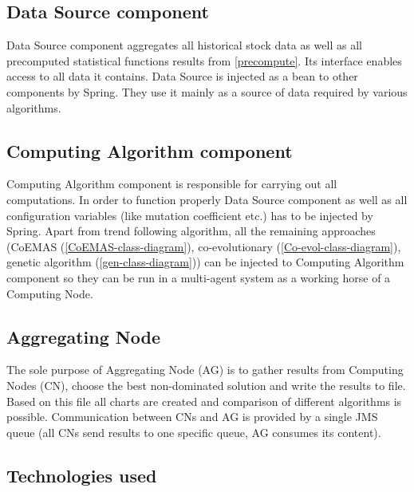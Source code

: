 \subsection{Data Source component}
\label{dataSource}

Data Source component aggregates all historical stock data as well as all precomputed statistical functions results from \ref{precompute}.   
Its interface enables access to all data it contains. Data Source is injected as a bean to other components by Spring.
They use it mainly as a source of data required by various algorithms.

\subsection{Computing Algorithm component}

Computing Algorithm component is responsible for carrying out all computations.
In order to function properly Data Source component as well as all configuration variables (like mutation coefficient etc.) has to be injected by Spring.
Apart from trend following algorithm, all the remaining approaches (CoEMAS (\ref{CoEMAS-class-diagram}), co-evolutionary (\ref{Co-evol-class-diagram}),
 genetic algorithm (\ref{gen-class-diagram})) can be injected to Computing Algorithm component so they can be run
 in a multi-agent system as a working horse of a Computing Node.


\subsection{Aggregating Node}

The sole purpose of Aggregating Node (AG) is to gather results from Computing Nodes (CN), choose the best non-dominated solution and write the results to file. 
Based on this file all charts are created and comparison of different algorithms is possible.
Communication between CNs and AG is provided by a single JMS queue (all CNs send results to one specific queue, AG consumes its content).


\subsection{Technologies used}

